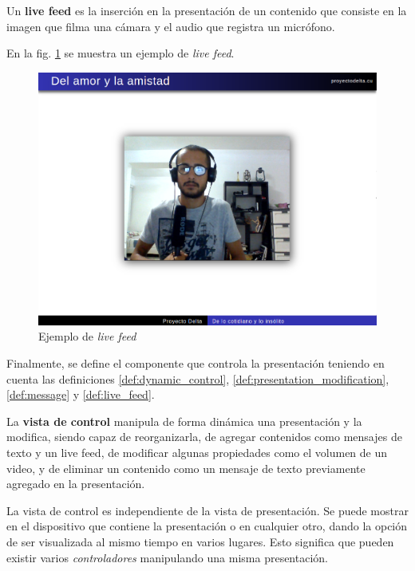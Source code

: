 		\begin{definition}
		\label{def:live_feed}
			Un \textnormal{\textbf{live feed}} es la inserción en la presentación de un contenido que consiste en la imagen que filma una cámara y el audio que registra un micrófono.
		\end{definition}

		En la fig. \ref{fig:live_feed} se muestra un ejemplo de \textit{live feed}.

		\begin{figure}[tb]
			\centering
			\includegraphics[width=12cm]{img/live_feed}
			\caption{Ejemplo de \textit{live feed}}
			\label{fig:live_feed}
		\end{figure}

		Finalmente, se define el componente que controla la presentación teniendo en cuenta las definiciones \ref{def:dynamic_control}, \ref{def:presentation_modification}, \ref{def:message} y \ref{def:live_feed}.

		\begin{definition}
		\label{def:control_view}
			La \textbf{vista de control} manipula de forma dinámica una presentación y la modifica, siendo capaz de reorganizarla, de agregar contenidos como mensajes de texto y un \textnormal{live feed}, de modificar algunas propiedades como el volumen de un video, y de eliminar un contenido como un mensaje de texto previamente agregado en la presentación. 
		\end{definition}		
		
		La vista de control es independiente de la vista de presentación. Se puede mostrar en el dispositivo que contiene la presentación o en cualquier otro, dando la opción de ser visualizada al mismo tiempo en varios lugares. Esto significa que pueden existir varios \textit{controladores} manipulando una misma presentación.


